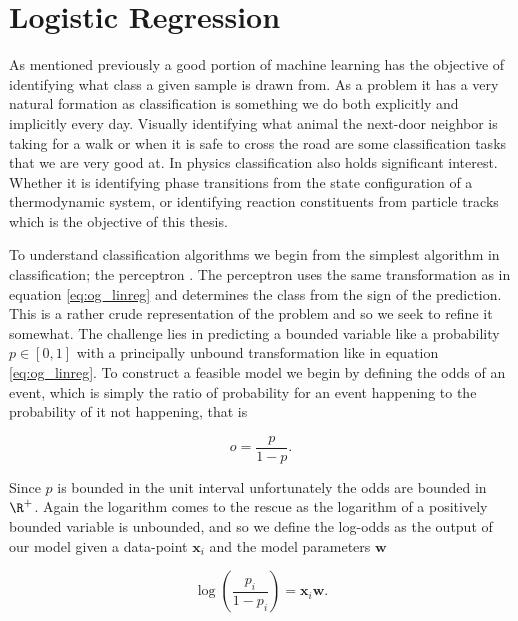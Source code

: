 
\section{Logistic Regression}\label{sec:LogReg}

As mentioned previously a good portion of machine learning has the objective of identifying what class a given sample is drawn from. As a problem it has a very natural formation as classification is something we do both explicitly and implicitly every day. Visually identifying what animal the next-door neighbor is taking for a walk or when it is safe to cross the road are some classification tasks that we are very good at. In physics classification also holds significant interest. Whether it is identifying phase transitions from the state configuration of a thermodynamic system, or identifying reaction constituents from particle tracks which is the objective of this thesis.

To understand classification algorithms we begin from the simplest algorithm in classification; the perceptron \cite{Rosenblatt1958}. The perceptron uses the same transformation as in equation \ref{eq:og_linreg} and determines the class from the sign of the prediction. This is a rather crude representation of the problem and so we seek to refine it somewhat. The challenge lies in predicting a bounded variable like a probability $p \in [0,1]$ with a principally unbound transformation like in equation \ref{eq:og_linreg}. To construct a feasible model we begin by defining the odds of an event, which is simply the ratio of probability for an event happening to the probability of it not happening, that is 

\begin{equation}\label{eq:odds}
o = \frac{p}{1-p}.
\end{equation}

\noindent Since $p$ is bounded in the unit interval unfortunately the odds are bounded in $\R^+$. Again the logarithm comes to the rescue as the logarithm of a positively bounded variable is unbounded, and so we define the log-odds as the output of our model given a data-point $\boldsymbol{x}_i$ and the model parameters $\boldsymbol{w}$

\begin{equation}\label{eq:log_odds}
\log \left(\frac{p_i}{1-p_i}\right) = \boldsymbol{x}_i\boldsymbol{w}. 
\end{equation} 

